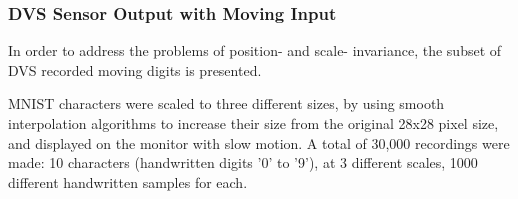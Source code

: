 	\subsubsection{DVS Sensor Output with Moving Input}
	In order to address the problems of position- and scale- invariance, the subset of DVS recorded moving digits is presented.
	
	MNIST characters were scaled to three different sizes, by using smooth interpolation algorithms to increase their size from the original 28x28 pixel size, and displayed on the monitor with slow motion. 
	A total of 30,000 recordings were made: 10 characters (handwritten digits '0' to '9'), at 3 different scales, 1000 different handwritten samples for each.
